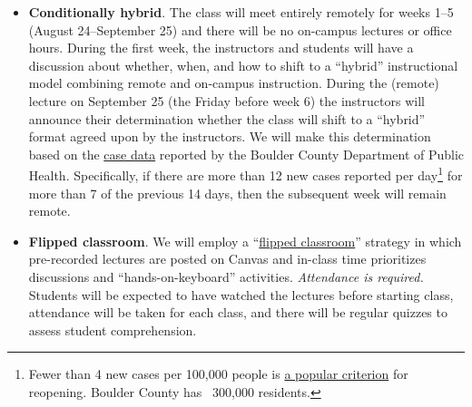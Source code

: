 \documentclass[10pt]{memoir}
\begin{document}
\begin{itemize}[itemsep=0pt,leftmargin=1em]
    
    \item \textbf{Conditionally hybrid}. The class will meet entirely remotely for weeks 1--5 (August 24--September 25) and there will be no on-campus lectures or office hours. During the first week, the instructors and students will have a discussion about whether, when, and how to shift to a ``hybrid'' instructional model combining remote and on-campus instruction. During the (remote) lecture on September 25 (the Friday before week 6) the instructors will announce their determination whether the class will shift to a ``hybrid'' format agreed upon by the instructors. We will make this determination based on the \href{https://www.bouldercounty.org/families/disease/covid-19/covid-19-illness-and-recovery/}{case data} reported by the Boulder County Department of Public Health. Specifically, if there are more than 12 new cases reported per day\footnote{Fewer than 4 new cases per 100,000 people is \href{https://www.vox.com/2020/5/28/21270515/coronavirus-covid-reopen-economy-social-distancing-states-map-data}{a popular criterion} for reopening. Boulder County has ~300,000 residents.} for more than 7 of the previous 14 days, then the subsequent week will remain remote. %
    
    \item \textbf{Flipped classroom}. We will employ a ``\href{https://en.wikipedia.org/wiki/Flipped_classroom}{flipped classroom}'' strategy in which pre-recorded lectures are posted on Canvas and in-class time prioritizes discussions and ``hands-on-keyboard'' activities. \textit{Attendance is required.} Students will be expected to have watched the lectures before starting class, attendance will be taken for each class, and there will be regular quizzes to assess student comprehension.
    
    

\end{itemize}
\end{document}
